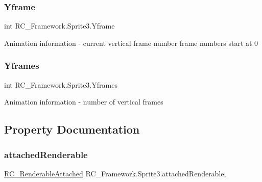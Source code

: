 \subsubsection{\texorpdfstring{Yframe}{Yframe}}
{\footnotesize\ttfamily int R\+C\+\_\+\+Framework.\+Sprite3.\+Yframe\hspace{0.3cm}{\ttfamily [protected]}}



Animation information -\/ current vertical frame number frame numbers start at 0 

\mbox{\label{class_r_c___framework_1_1_sprite3_ac70dad68ff6f97705846e0c43db63295}} 
\subsubsection{\texorpdfstring{Yframes}{Yframes}}
{\footnotesize\ttfamily int R\+C\+\_\+\+Framework.\+Sprite3.\+Yframes\hspace{0.3cm}{\ttfamily [protected]}}



Animation information -\/ number of vertical frames 



\subsection{Property Documentation}
\mbox{\label{class_r_c___framework_1_1_sprite3_a4c216d42873e3e4d52d30596f3078bc8}} 
\subsubsection{\texorpdfstring{attached\+Renderable}{attachedRenderable}}
{\footnotesize\ttfamily \mbox{\hyperlink{class_r_c___framework_1_1_r_c___renderable_attached}{R\+C\+\_\+\+Renderable\+Attached}} R\+C\+\_\+\+Framework.\+Sprite3.\+attached\+Renderable\hspace{0.3cm}{\ttfamily [get]}, {\ttfamily [set]}}



